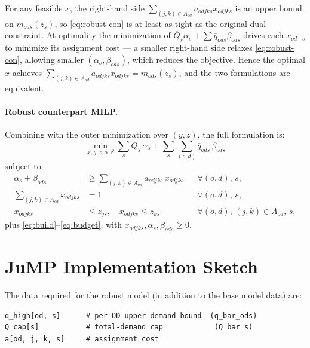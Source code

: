 \documentclass[11pt]{article}
\theoremstyle{definition}
\begin{document}
For any feasible $x$, the right-hand side
$\sum_{(j,k)\in A_{od}}a_{odjks}x_{odjks}$
is an upper bound on $m_{ods}(z_s)$, so \eqref{eq:robust-con} is
at least as tight as the original dual constraint.  At optimality the
minimization of $\overline{Q}_s\alpha_s + \sum\overline{q}_{ods}\beta_{ods}$
drives each $x_{od\cdot\cdot s}$ to minimize its assignment cost --- a smaller
right-hand side relaxes \eqref{eq:robust-con}, allowing smaller
$(\alpha_s, \beta_{ods})$, which reduces the objective.  Hence the optimal $x$
achieves
$\sum_{(j,k)\in A_{od}}a_{odjks}x_{odjks} = m_{ods}(z_s)$, and the two
formulations are equivalent.

\paragraph{Robust counterpart MILP.}
Combining with the outer minimization over $(y,z)$, the full formulation is:
\begin{equation}
	\min_{x,y,z,\alpha,\beta}
	\sum_s \overline{Q}_s\,\alpha_s
	+ \sum_s\sum_{(o,d)} \overline{q}_{ods}\,\beta_{ods}
	\label{eq:robust-counterpart}
\end{equation}
subject to
\begin{align}
	\alpha_s + \beta_{ods}
	                                 & \ge \sum_{(j,k)\in A_{od}} a_{odjks}\,x_{odjks}
	                                 &                                                 & \forall (o,d),\, s,
	\label{eq:robust-con-milp}
	\\
	\sum_{(j,k)\in A_{od}} x_{odjks} & = 1
	                                 &                                                 & \forall (o,d),\, s,
	\label{eq:recourse-counterpart-assign}
	\\
	x_{odjks}                        & \le z_{js},\quad x_{odjks} \le z_{ks}
	                                 &                                                 & \forall (o,d),\, (j,k)\in A_{od},\, s,
	\label{eq:recourse-counterpart-active}
\end{align}
plus \eqref{eq:build}--\eqref{eq:budget}, with $x_{odjks},\alpha_s,\beta_{ods}\ge 0$.

\section{JuMP Implementation Sketch}
\label{sec:jump}

The data required for the robust model (in addition to the base model data) are:
\begin{verbatim}
q_high[od, s]      # per-OD upper demand bound  (q_bar_ods)
Q_cap[s]           # total-demand cap            (Q_bar_s)
a[od, j, k, s]     # assignment cost
\end{verbatim}
\end{document}
